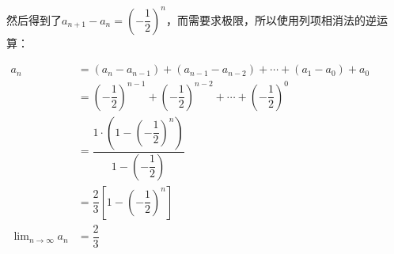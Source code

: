 \documentclass[UTF8]{ctexart}
\begin{document}
然后得到了$a_{n+1}-a_n=\left(-\dfrac{1}{2}\right)^n$，而需要求极限，所以使用列项相消法的逆运算：

$
\begin{aligned}
    a_n & = (a_n-a_{n-1})+(a_{n-1}-a_{n-2})+\cdots+(a_1-a_0)+a_0 \\
     & = \left(-\dfrac{1}{2}\right)^{n-1} + \left(-\dfrac{1}{2}\right)^{n-2} + \cdots + \left(-\dfrac{1}{2}\right)^0 \\
     & = \dfrac{1\cdot\left(1-\left(-\dfrac{1}{2}\right)^n\right)}{1-\left(-\dfrac{1}{2}\right)} \\
     & = \dfrac{2}{3}\left[1-\left(-\dfrac{1}{2}\right)^n\right] \\
    \lim_{n\to\infty}a_n & =\dfrac{2}{3}
\end{aligned}
$
\end{document}
